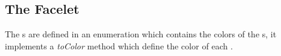 \subsection{The Facelet}
The \facelet{}s are defined in an enumeration which contains the colors of the \facelet{}s, it implements a \textit{toColor} method which define the color of each \facelet{}.